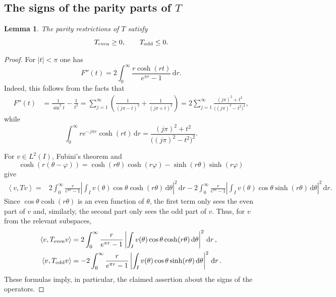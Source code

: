 \documentclass[11pt]{article}
\newtheorem{lemma}[theorem]{Lemma}
\theoremstyle{definition}
\theoremstyle{remark}
\newcommand{\ip}[2]{\left\langle #1,#2\right\rangle}
\newcommand{\dd}{\,\mathrm{d}}
\begin{document}

\subsection*{The signs of the parity parts of $T$}

\begin{lemma}\label{lem:T-parity}
The parity restrictions of $T$ satisfy
\[
T_{\rm even}\geq0,
\qquad
T_{\rm odd}\leq0.
\]
\end{lemma}

\begin{proof}
For $|t|<\pi$ one has
\begin{equation}\label{eq:fdoubleprimerepr}
F''(t)=2\int_0^\infty
\frac{r\cosh(rt)}{e^{\pi r}-1}\dd r.
\end{equation}
Indeed, this follows from the facts that
\begin{align*}
F''(t)
&=\frac1{\sin^2t}-\frac1{t^2}
=\sum_{j=1}^\infty
\left(\frac1{(j\pi-t)^2}+\frac1{(j\pi+t)^2}\right)
=2\sum_{j=1}^\infty
\frac{(j\pi)^2+t^2}{\bigl((j\pi)^2-t^2\bigr)^2},
\end{align*}
while
\[
\int_0^\infty re^{-j\pi r}\cosh(rt)\dd r
=\frac{(j\pi)^2+t^2}{\bigl((j\pi)^2-t^2\bigr)^2}.
\]

For $v\in L^2(I)$, Fubini's theorem and
\[
\cosh(r(\theta-\varphi))
=\cosh(r\theta)\cosh(r\varphi)
-\sinh(r\theta)\sinh(r\varphi)
\]
give
\begin{align*}
\ip{v}{Tv}
={}&2\int_0^\infty\frac{r}{e^{\pi r}-1}
\left|\int_Iv(\theta)\cos\theta\cosh(r\theta)\dd\theta\right|^2\dd r
-2\int_0^\infty\frac{r}{e^{\pi r}-1}
\left|\int_Iv(\theta)\cos\theta\sinh(r\theta)\dd\theta\right|^2\dd r.
\end{align*}
Since $\cos\theta \cosh(r\theta)$ is an even function of $\theta$, the first term only sees the even part of $v$ and, similarly, the second part only sees the odd part of $v$. Thus, for $v$ from the relevant subspaces,
    \begin{align*}
        \ip{v}{T_{\rm even} v} & = 2 \int_0^\infty \frac{r}{e^{\pi r}-1} \left| \int_I v(\theta) \cos\theta \cosh(r\theta) \dd\theta\right|^2 \dd r \,,\\
        \ip{v}{T_{\rm odd} v} & = - 2 \int_0^\infty \frac{r}{e^{\pi r}-1} \left| \int_I v(\theta) \cos\theta \sinh(r\theta) \dd\theta\right|^2 \dd r \,.
    \end{align*}
    These formulas imply, in particular, the claimed assertion about the signs of the operators. 
\end{proof}
\end{document}
